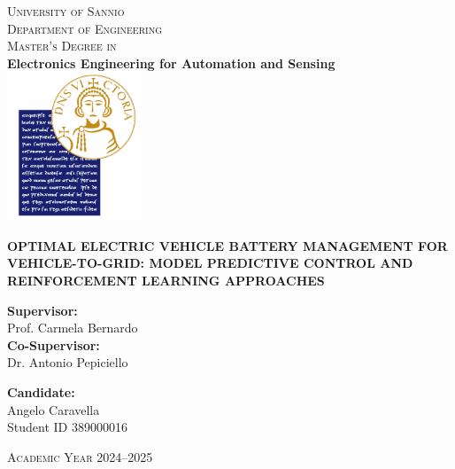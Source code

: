 \documentclass[a4paper,12pt]{report}
\begin{document}
\begin{titlepage}
    \begin{center}
        \vspace*{1cm} %
        \textsc{\LARGE University of Sannio}\\[1cm]
        \textsc{Department of Engineering}\\[0.8cm]
        \textsc{Master’s Degree in}\\[0.6cm]
        \textbf{Electronics Engineering for Automation and Sensing}\\[1.5cm]
        \includegraphics[width=0.3\textwidth]{Logo.png}

        \vfill %

        {\Huge \bfseries
             OPTIMAL ELECTRIC VEHICLE BATTERY MANAGEMENT FOR VEHICLE-TO-GRID: MODEL PREDICTIVE CONTROL AND REINFORCEMENT LEARNING APPROACHES
        }

        \vfill %

        \begin{minipage}{0.45\textwidth}
            \large
            \raggedright
            \textbf{Supervisor:}\\
            Prof. Carmela Bernardo \\[0.8cm]
            \textbf{Co-Supervisor:}\\
            Dr. Antonio Pepiciello
        \end{minipage}
        \hfill
        \begin{minipage}{0.45\textwidth}
            \large
            \raggedleft
            \textbf{Candidate:}\\
            Angelo Caravella
            \\
             Student ID 389000016
        \end{minipage}

        \vfill %

        {\large \textsc{Academic Year 2024--2025}}
        \vspace*{1.5cm} %
    \end{center}
\end{titlepage}
\end{document}
